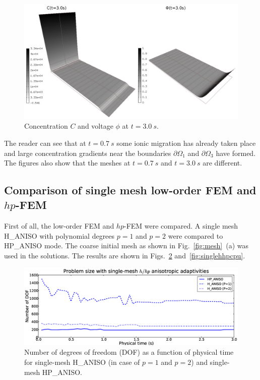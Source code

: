 
\begin{figure}[!ht]
  \begin{centering}
  \includegraphics[width=\columnwidth]{cphi-2}
  \caption{\label{fig:cphi-2} Concentration $C$
  and voltage $\phi$ at $t=3.0\ s$.}
  \end{centering}
\end{figure}

The reader can see that at $t=0.7\ s$ some ionic migration has already 
taken place and large concentration gradients near the boundaries $\partial\Omega_1$ 
and $\partial\Omega_3$ have formed. The figures also show that the meshes 
at $t=0.7\ s$ and $t=3.0\ s$ are different. 

\subsection{Comparison of single mesh low-order FEM and $hp$-FEM}

First of all, the low-order FEM and $hp$-FEM were compared. A single mesh
H\_ANISO with polynomial degrees $p=1$ and $p=2$ were compared to
HP\_ANISO mode. The coarse initial mesh as shown in Fig.~\ref{fig:mesh}~(a)
was used in the solutions.
The results are shown in Figs.~\ref{fig:singlehhpdof} 
and~\ref{fig:singlehhpcpu}.
\begin{figure}[!ht]
  \begin{centering}
  \includegraphics[width=\columnwidth]{singleh_hp_dof}
  \caption{\label{fig:singlehhpdof} Number of degrees of freedom (DOF) as a function 
  of physical time for single-mesh H\_ANISO (in case of
  $p=1$ and $p=2$) and single-mesh HP\_ANISO.}
  \end{centering}
\end{figure}


